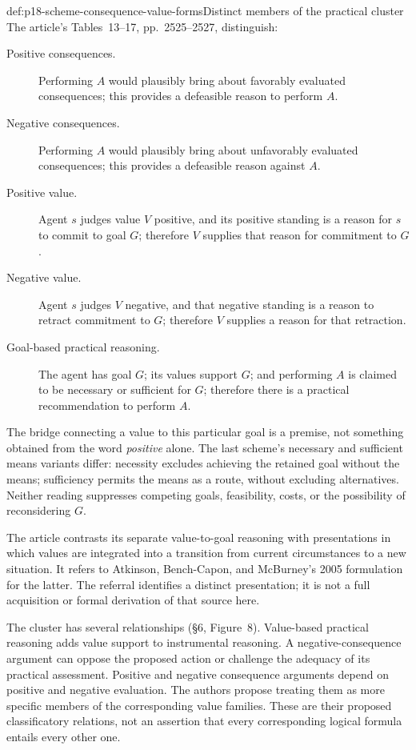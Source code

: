 \begin{hbdefinition}{def:p18-scheme-consequence-value-forms}{Distinct members of the practical cluster}
The article's Tables~13--17, pp.~2525--2527, distinguish:
\begin{description}
\item[Positive consequences.] Performing \(A\) would plausibly bring
about favorably evaluated consequences; this provides a defeasible
reason to perform \(A\).
\item[Negative consequences.] Performing \(A\) would plausibly bring
about unfavorably evaluated consequences; this provides a defeasible
reason against \(A\).
\item[Positive value.] Agent \(s\) judges value \(V\) positive, and
its positive standing is a reason for \(s\) to commit to goal \(G\);
therefore \(V\) supplies that reason for commitment to \(G\).
\item[Negative value.] Agent \(s\) judges \(V\) negative, and that
negative standing is a reason to retract commitment to \(G\);
therefore \(V\) supplies a reason for that retraction.
\item[Goal-based practical reasoning.] The agent has goal \(G\);
its values support \(G\); and performing \(A\) is claimed to be
necessary or sufficient for \(G\); therefore there is a practical
recommendation to perform \(A\).
\end{description}
The bridge connecting a value to this particular goal is a premise,
not something obtained from the word \emph{positive} alone.
The last scheme's necessary and sufficient means variants differ:
necessity excludes achieving the retained goal without the means;
sufficiency permits the means as a route, without excluding alternatives.
Neither reading suppresses competing goals, feasibility, costs, or
the possibility of reconsidering \(G\).
\end{hbdefinition}

The article contrasts its separate value-to-goal reasoning with
presentations in which values are integrated into a transition from
current circumstances to a new situation. It refers to Atkinson,
Bench-Capon, and McBurney's 2005 formulation for the latter.
The referral identifies a distinct presentation; it is not a full
acquisition or formal derivation of that source here.

The cluster has several relationships (\S6, Figure~8).
Value-based practical reasoning adds value support to instrumental
reasoning. A negative-consequence argument can oppose the proposed
action or challenge the adequacy of its practical assessment.
Positive and negative consequence arguments depend on positive and
negative evaluation. The authors propose treating them as more specific
members of the corresponding value families.
These are their proposed classificatory relations, not an assertion
that every corresponding logical formula entails every other one.

